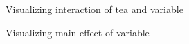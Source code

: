 \documentclass{article}
\begin{document}
\begin{figure}[H]
  \caption{Visualizing interaction of tea and variable}
  \noindent{}
  \centering
\end{figure}

\begin{figure}[H]
  \caption{Visualizing main effect of variable}
  \noindent{}
  \centering
\end{figure}
\end{document}
